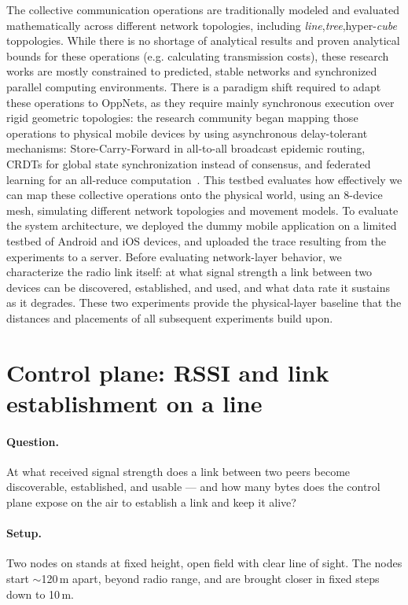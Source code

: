 The collective communication operations are traditionally modeled and evaluated mathematically across different network topologies, including \emph{line},\emph{tree},hyper-\emph{cube} toppologies.
While there is no shortage of analytical results and proven analytical bounds for these operations (e.g. calculating transmission costs), these research works are mostly constrained to predicted, stable networks and synchronized parallel computing environments. There is a paradigm shift required to adapt these operations to OppNets, as they require mainly synchronous execution over rigid geometric topologies: the research community began mapping those operations to physical mobile devices by using asynchronous delay-tolerant mechanisms: Store-Carry-Forward in all-to-all broadcast epidemic routing, CRDTs for global state synchronization instead of consensus, and federated learning for an all-reduce computation~\cite{Maheo2023,TranTruong2026}. This testbed evaluates how effectively we can map these collective operations onto the physical world, using an 8-device mesh, simulating different network topologies and movement models. To evaluate the system architecture, we deployed the dummy mobile application on a limited testbed of Android and iOS devices, and uploaded the trace resulting from the experiments to a server. Before evaluating network-layer behavior, we characterize the radio link itself: at what signal strength a link between two devices can be discovered, established, and used, and what data rate it sustains as it degrades. These two experiments provide the physical-layer baseline that the distances and placements of all subsequent experiments build upon.

\section{Control plane: RSSI and link establishment on a line}

\paragraph{Question.} At what received signal strength does a link between two peers
become discoverable, established, and usable --- and how many bytes does the control
plane expose on the air to establish a link and keep it alive?

\paragraph{Setup.} Two nodes on stands at fixed height, open field with clear line of
sight. The nodes start $\sim$120\,m apart, beyond radio range, and are brought closer
in fixed steps down to 10\,m.

